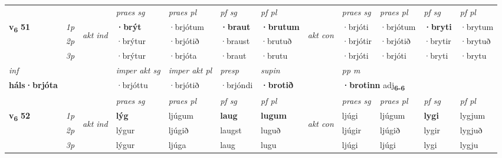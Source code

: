 \begin{longtable}[l]{X>{\footnotesize\itshape}llXXXXlXXXX}
 & &   & \textit{praes sg}  & \textit{praes pl}    & \textit{ pf sg} & \textit{pf pl} & & \textit{praes sg}  & \textit{praes pl}    & \textit{pf sg} & \textit{pf pl }  \\ \cmidrule{4-7} \cmidrule{9-12}
 \multirow{2}{*}{{{\textbf{v{\textsubscript{6}}} \Large{\textbf{51}}}}}  & 1p & \multirow{3}{*}{\begin{turn}{90}\textit{akt ind}\end{turn}} & \textbf{·brýt} & ·brjótum & \textbf{·braut} & \textbf{·brutum} & \multirow{3}{*}{\begin{turn}{90}\textit{akt con}\end{turn}} &·brjóti & ·brjótum & \textbf{·bryti} & ·brytum\\*
 & 2p &  &  ·brýtur  & ·brjótið & ·braust & ·brutuð & & ·brjótir & ·brjótið & ·brytir & ·brytuð \\*
 & 3p &  & ·brýtur & ·brjóta & ·braut & ·brutu & & ·brjóti & ·brjóti& ·bryti & ·brytu \\*
\cmidrule{4-7} \cmidrule{9-12}

   {\textit{inf}} & &  & \textit{imper akt sg} & \textit{imper akt pl}   & \textit{presp} & \textit{supin}  && \textit{pp m} \\*
  {\textbf{háls\allowbreak ·brjóta}} & && ·brjóttu  & ·brjótið   & ·brjóndi &  \textbf{·brotið}  && \multicolumn{2}{l}{\textbf{·brotinn} adj\textbf{\textsubscript{6-6}}} \\*

\midrule

 & &   & \textit{praes sg}  & \textit{praes pl}    & \textit{ pf sg} & \textit{pf pl} & & \textit{praes sg}  & \textit{praes pl}    & \textit{pf sg} & \textit{pf pl }  \\ \cmidrule{4-7} \cmidrule{9-12}
 \multirow{2}{*}{{{\textbf{v{\textsubscript{6}}} \Large{\textbf{52}}}}}  & 1p & \multirow{3}{*}{\begin{turn}{90}\textit{akt ind}\end{turn}} & \textbf{lýg} & ljúgum & \textbf{laug} & \textbf{lugum} & \multirow{3}{*}{\begin{turn}{90}\textit{akt con}\end{turn}} &ljúgi & ljúgum & \textbf{lygi} & lygjum\\*
 & 2p &  &  lýgur  & ljúgið & laugst & luguð & & ljúgir & ljúgið & lygir & lygjuð \\*
 & 3p &  & lýgur & ljúga & laug & lugu & & ljúgi & ljúgi& lygi & lygju \\*
\cmidrule{4-7} \cmidrule{9-12}


\end{longtable}
